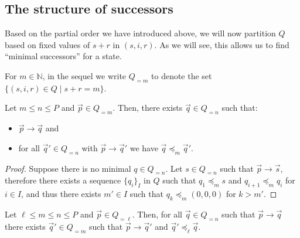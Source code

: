 \subsection{The structure of successors}
Based on the partial order we have introduced above, we will now partition $Q$ based on fixed values of $s + r$ in $(s,i,r)$. As we will see, this allows us to find ``minimal successors'' for a state.

For $m \in \mathbb{N}$, in the sequel we write $Q_{=m}$ to denote the set $\{(s,i,r) \in Q \mid s + r = m\}$.

\begin{claim}
    Let $m \leq n \leq P$ and $\vec{p} \in Q_{=m}$. Then, there exists $\vec{q} \in Q_{=n}$ such that:
    \begin{itemize}
        \item $\vec{p} \rightarrow \vec{q}$ and
        \item for all $\vec{q}' \in Q_{=n}$ with $\vec{p} \rightarrow \vec{q}'$ we have
    $\vec{q} \preceq_m \vec{q}'$.
    \end{itemize} 
\end{claim}

\begin{proof}
Suppose there is no minimal $q\in Q_{=n}$. Let $s\in Q_{=n}$ such that $\vec{p} \rightarrow \vec{s}$, therefore there exists a sequence $\{q_i\}_I$ in $Q$ such that $q_1\preceq_m s$ and $q_{i+1}\preceq_m q_i$ for $i \in I$, and thus there exists $m'\in I$ such that $q_k\preceq_m (0,0,0)$ for $k>m'$. %



\end{proof}

\begin{claim}
    Let $\ell \leq m \leq n \leq P$ and $\vec{p} \in Q_{=\ell}$. Then, for all $\vec{q} \in Q_{=n}$ such that $\vec{p} \rightarrow \vec{q}$ there exists $\vec{q}' \in Q_{=m}$ such that $\vec{p} \rightarrow \vec{q}'$ and $\vec{q}' \preceq_\ell \vec{q}$.
\end{claim}

